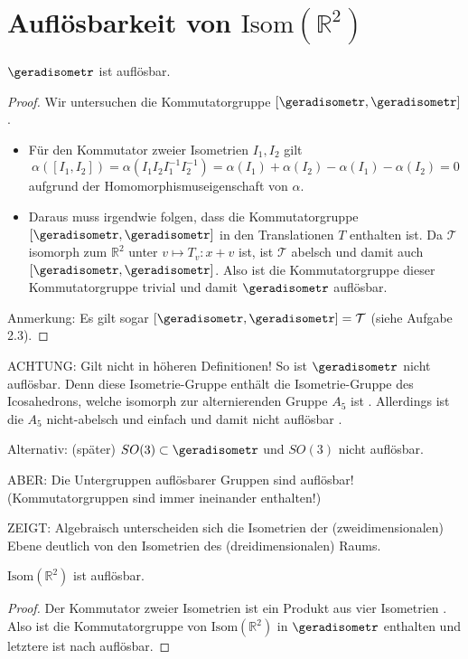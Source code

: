 \section{Auflösbarkeit von \(\mathrm{Isom}(\mathbb R^2)\)}\label{sec:auflösbarkeit-der-isometrien}
\begin{proposition}
    \(\geradisometr\) ist auflösbar. 
\end{proposition}
\begin{proof}
    Wir untersuchen die Kommutatorgruppe \([\geradisometr, \geradisometr]\). 
    \begin{itemize}
        \item Für den Kommutator zweier Isometrien \(I_1, I_2\) gilt
        \begin{equation*}
            \alpha([I_1, I_2]) = \alpha(I_1 I_2 I_1^{-1} I_2^{-1}) = \alpha(I_1) + \alpha(I_2) - \alpha(I_1) - \alpha(I_2) = 0
        \end{equation*}
        aufgrund der Homomorphismuseigenschaft von \(\alpha\). 

        \item Daraus muss irgendwie  folgen, dass die Kommutatorgruppe \([\geradisometr, \geradisometr]\) in den Translationen \(T\) enthalten ist. Da \(\mathcal T\) isomorph zum \(\mathbb R^2\) unter \(v \mapsto T_v: x + v\) ist, ist \(\mathcal T\) abelsch und damit auch \([\geradisometr, \geradisometr]\). Also ist die Kommutatorgruppe dieser Kommutatorgruppe trivial und damit \(\geradisometr\) auflösbar. 
    \end{itemize}

    Anmerkung: Es gilt sogar \([\geradisometr, \geradisometr] = \mathcal T\) (siehe Aufgabe 2.3). 
\end{proof}
ACHTUNG: Gilt nicht in höheren Definitionen! So ist \(\geradisometr\) nicht auflösbar. Denn diese Isometrie-Gruppe enthält die Isometrie-Gruppe des Icosahedrons, welche isomorph zur alternierenden Gruppe \(A_5\) ist . Allerdings ist die \(A_5\) nicht-abelsch  und einfach  und damit nicht auflösbar . 

Alternativ: (später) \(SO(3) \subset \geradisometr\) und \(SO(3)\) nicht auflösbar. 

ABER: Die Untergruppen auflösbarer Gruppen sind auflösbar! (Kommutatorgruppen sind immer ineinander enthalten!) 

ZEIGT: Algebraisch unterscheiden sich die Isometrien der (zweidimensionalen) Ebene deutlich von den Isometrien des (dreidimensionalen) Raums. 

\begin{corollarystrd}
    \(\mathrm{Isom}(\mathbb R^2)\) ist auflösbar. 
\end{corollarystrd}
\begin{proof}
    Der Kommutator zweier Isometrien ist ein Produkt aus vier Isometrien . Also ist die Kommutatorgruppe von \(\mathrm{Isom}(\mathbb R^2)\) in \(\geradisometr\) enthalten und letztere ist nach  auflösbar. 
\end{proof}